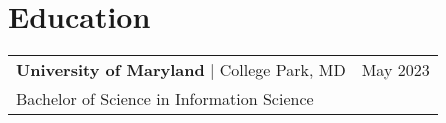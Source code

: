 \documentclass[a4paper,10pt]{article}
\begin{document}

\section{Education}
\begin{tabularx}{\linewidth}{@{}l X@{}}	
\textbf{University of Maryland} | College Park, MD &  \hfill \normalsize May 2023 \\
Bachelor of Science in Information Science & \hfill \\ 
\end{tabularx}

\end{document}
